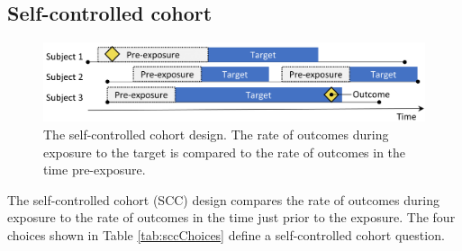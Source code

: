\documentclass[]{book}
\begin{document}
\subsection{Self-controlled cohort}\label{self-controlled-cohort}

\begin{figure}

{\centering \includegraphics[width=0.9\linewidth]{images/PopulationLevelEstimation/selfControlledCohort} 

}

\caption{The self-controlled cohort design. The rate of outcomes during exposure to the target is compared to the rate of outcomes in the time pre-exposure.}\label{fig:scc}
\end{figure}

The self-controlled cohort (SCC) design \citep{ryan_2013} compares the
rate of outcomes during exposure to the rate of outcomes in the time
just prior to the exposure. The four choices shown in Table
\ref{tab:sccChoices} define a self-controlled cohort question.
\end{document}
